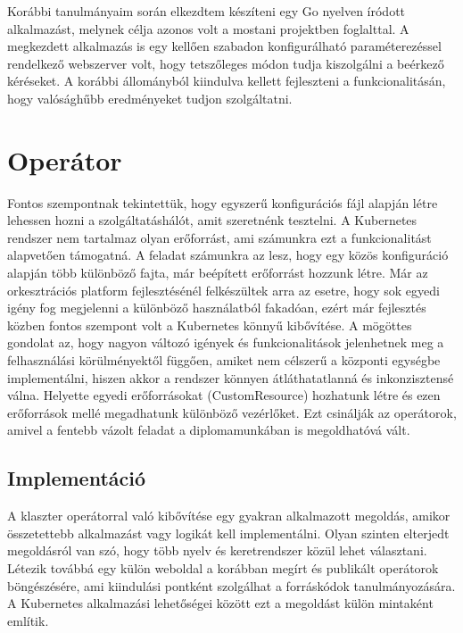Korábbi tanulmányaim során elkezdtem készíteni egy Go nyelven íródott alkalmazást, melynek célja azonos volt a mostani projektben foglalttal.
A megkezdett alkalmazás is egy kellően szabadon konfigurálható paraméterezéssel rendelkező webszerver volt, hogy tetszőleges módon tudja kiszolgálni a beérkező kéréseket. 
A korábbi állományból kiindulva kellett fejleszteni a funkcionalitásán, hogy valósághűbb eredményeket tudjon szolgáltatni.

\section{Operátor}
Fontos szempontnak tekintettük, hogy egyszerű konfigurációs fájl alapján létre lehessen hozni a szolgáltatáshálót, amit szeretnénk tesztelni.
A Kubernetes rendszer nem tartalmaz olyan erőforrást, ami számunkra ezt a funkcionalitást alapvetően támogatná.
A feladat számunkra az lesz, hogy egy közös konfiguráció alapján több különböző fajta, már beépített erőforrást hozzunk létre.
Már az orkesztrációs platform fejlesztésénél felkészültek arra az esetre, hogy sok egyedi igény fog megjelenni a különböző használatból fakadóan, ezért már fejlesztés közben fontos szempont volt a Kubernetes könnyű kibővítése.
A mögöttes gondolat az, hogy nagyon változó igények és funkcionalitások jelenhetnek meg a felhasználási körülményektől függően, amiket nem célszerű a központi egységbe implementálni, hiszen akkor a rendszer könnyen átláthatatlanná és inkonzisztensé válna.
Helyette egyedi erőforrásokat (CustomResource) hozhatunk létre és ezen erőforrások mellé megadhatunk különböző vezérlőket. Ezt csinálják az operátorok, amivel a fentebb vázolt feladat a diplomamunkában is megoldhatóvá vált.

\subsection{Implementáció}
A klaszter operátorral való kibővítése egy gyakran alkalmazott megoldás, amikor összetettebb alkalmazást vagy logikát kell implementálni.
Olyan szinten elterjedt megoldásról van szó, hogy több nyelv és keretrendszer közül lehet választani\citep{availableOperatorFrameworks}.
Létezik továbbá egy külön weboldal a korábban megírt és publikált operátorok böngészésére, ami kiindulási pontként szolgálhat a forráskódok tanulmányozására.\citep{operatorhub} 
A Kubernetes alkalmazási lehetőségei között ezt a megoldást külön mintaként említik.\citep{KubernetesPatterns} 

